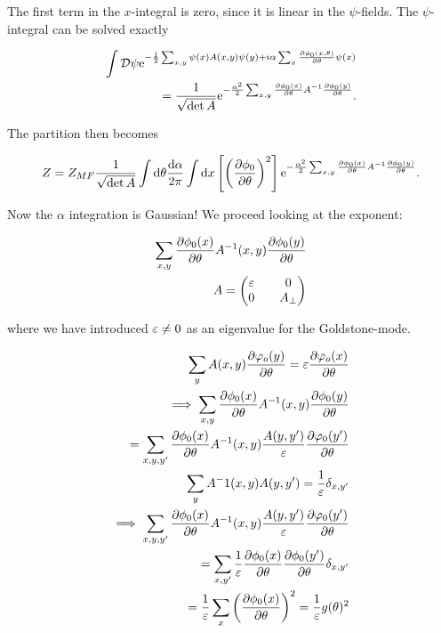 The first term in the $x$-integral is zero, since it is linear in the $\psi$-fields. The $\psi$-integral can be solved exactly 

\begin{align*}
    \int \mathcal{D} \psi \mathrm{e}^{-\frac{1}{2}\sum_{x,y} \psi(x) A(x,y) \psi(y) + i\alpha \sum_x \pdv{\phi_0(x,\theta)}{\theta}\psi(x)} \\ 
    = \frac{1}{\sqrt{\det A}}\mathrm{e}^{-\frac{\alpha^2}{2}\sum_{x,y} \pdv{\phi_0(x)}{\theta}A^{-1}\pdv{\phi_0(y)}{\theta}}.
\end{align*}

The partition then becomes 

\begin{align*}
    Z = Z_{MF} \frac{1}{\sqrt{\det A}} \int \dd \theta \frac{\dd \alpha}{2\pi} \int \dd x \left[\left(\pdv{\phi_0}{\theta}\right)^2 \right] \mathrm{e}^{-\frac{\alpha^2}{2}\sum_{x,y} \pdv{\phi_0(x)}{\theta}A^{-1}\pdv{\phi_0(y)}{\theta}}.
\end{align*}

Now the $\alpha$ integration is Gaussian! We proceed looking at the exponent: 

\begin{align*}
    \sum_{x,y} \pdv{\phi_0(x)}{\theta}A^{-1}(x,y)\pdv{\phi_0(y)}{\theta} \\ 
    A = \begin{pmatrix} \varepsilon && 0 \\ 0 && A_{\perp} \end{pmatrix}
\end{align*}

where we have introduced $\varepsilon \neq 0$ as an eigenvalue for the Goldstone-mode. 

\begin{align*}
    \sum_y A(x,y) \pdv{\varphi_o(y)}{\theta} = \varepsilon \pdv{\varphi_o(x)}{\theta} \\ 
    \implies \sum_{x,y} \pdv{\phi_0(x)}{\theta}A^{-1}(x,y)\pdv{\phi_0(y)}{\theta} \\ 
    = \sum_{x,y,y'} \pdv{\phi_0(x)}{\theta}A^{-1}(x,y) \frac{A(y,y')}{\varepsilon} \pdv{\varphi_0(y')}{\theta} \\ 
    \sum_y A^-1(x,y)A(y,y') = \frac{1}{\varepsilon}\delta_{x,y'} \\
    \implies \sum_{x,y,y'} \pdv{\phi_0(x)}{\theta}A^{-1}(x,y) \frac{A(y,y')}{\varepsilon} \pdv{\varphi_0(y')}{\theta} \\ 
    = \sum_{x,y'} \frac{1}{\varepsilon}\pdv{\phi_0(x)}{\theta}\pdv{\phi_0(y')}{\theta}\delta_{x,y'} \\
    = \frac{1}{\varepsilon}\sum_x \left(\pdv{\phi_0(x)}{\theta}\right)^2 = \frac{1}{\varepsilon} g(\theta)^2
\end{align*}


